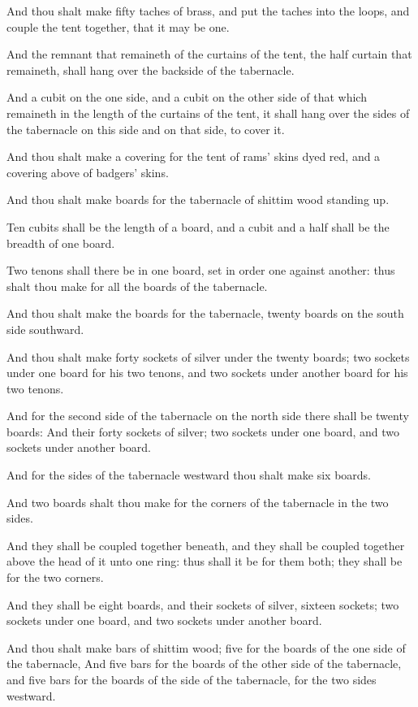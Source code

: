 \verse And thou shalt make fifty taches of brass, and put the taches
into the loops, and couple the tent together, that it may be one.

\verse And the remnant that remaineth of the curtains of the tent, the
half curtain that remaineth, shall hang over the backside of the
tabernacle.

\verse And a cubit on the one side, and a cubit on the other side of
that which remaineth in the length of the curtains of the tent, it
shall hang over the sides of the tabernacle on this side and on that
side, to cover it.

\verse And thou shalt make a covering for the tent of rams' skins dyed
red, and a covering above of badgers' skins.

\verse And thou shalt make boards for the tabernacle of shittim wood
standing up.

\verse Ten cubits shall be the length of a board, and a cubit and a
half shall be the breadth of one board.

\verse Two tenons shall there be in one board, set in order one against
another: thus shalt thou make for all the boards of the tabernacle.

\verse And thou shalt make the boards for the tabernacle, twenty boards
on the south side southward.

\verse And thou shalt make forty sockets of silver under the twenty
boards; two sockets under one board for his two tenons, and two
sockets under another board for his two tenons.

\verse And for the second side of the tabernacle on the north side
there shall be twenty boards: \verse And their forty sockets of silver;
two sockets under one board, and two sockets under another board.

\verse And for the sides of the tabernacle westward thou shalt make six
boards.

\verse And two boards shalt thou make for the corners of the tabernacle
in the two sides.

\verse And they shall be coupled together beneath, and they shall be
coupled together above the head of it unto one ring: thus shall it be
for them both; they shall be for the two corners.

\verse And they shall be eight boards, and their sockets of silver,
sixteen sockets; two sockets under one board, and two sockets under
another board.

\verse And thou shalt make bars of shittim wood; five for the boards of
the one side of the tabernacle, \verse And five bars for the boards of
the other side of the tabernacle, and five bars for the boards of the
side of the tabernacle, for the two sides westward.

